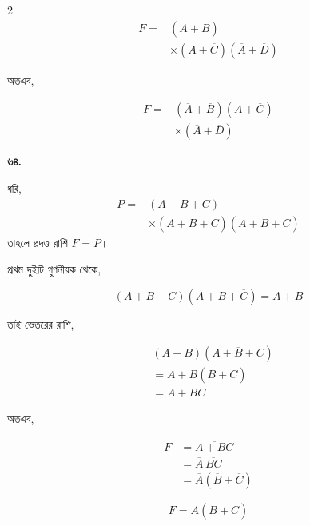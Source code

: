\begin{multicols}{2}
\[
\begin{aligned}
F
={}&(\overline A+\overline B)\\
&\times(A+\overline C)
(\overline A+\overline D)
\end{aligned}
\]

অতএব,

\[
\boxed{
\begin{aligned}
F
={}&(\overline A+\overline B)
(A+\overline C)\\
&\times(\overline A+\overline D)
\end{aligned}
}
\]

\medskip


\textbf{৬৪.}

ধরি,
\[\begin{aligned}
P={}&(A+B+C)\\
&\times(A+B+\overline C)(A+\overline B+C)
\end{aligned}\]
তাহলে প্রদত্ত রাশি \(F=\overline P\)।

প্রথম দুইটি গুণনীয়ক থেকে,

\[
(A+B+C)(A+B+\overline C)=A+B
\]

তাই ভেতরের রাশি,

\[
\begin{aligned}
&(A+B)(A+\overline B+C)\\
&=A+B(\overline B+C)\\
&=A+BC
\end{aligned}
\]

অতএব,

\[
\begin{aligned}
F
&=\overline{A+BC}\\
&=\overline A\,\overline{BC}\\
&=\overline A(\overline B+\overline C)
\end{aligned}
\]

\[
\boxed{
F=\overline A(\overline B+\overline C)
}
\]

\end{multicols}

\setlength{\columnseprule}{0pt}